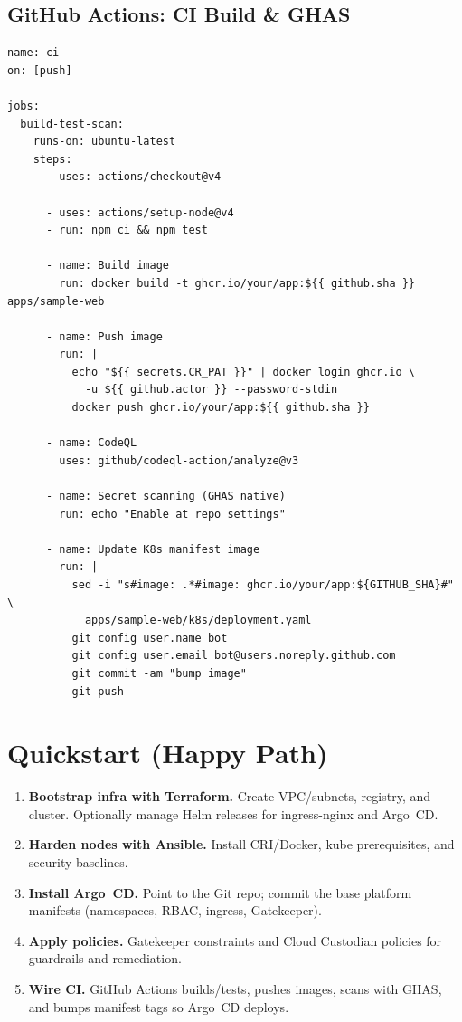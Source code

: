 \documentclass[11pt]{article}
\begin{document}
\subsection{GitHub Actions: CI Build \& GHAS}
\par
\begin{verbatim}
name: ci
on: [push]

jobs:
  build-test-scan:
    runs-on: ubuntu-latest
    steps:
      - uses: actions/checkout@v4

      - uses: actions/setup-node@v4
      - run: npm ci && npm test

      - name: Build image
        run: docker build -t ghcr.io/your/app:${{ github.sha }} apps/sample-web

      - name: Push image
        run: |
          echo "${{ secrets.CR_PAT }}" | docker login ghcr.io \
            -u ${{ github.actor }} --password-stdin
          docker push ghcr.io/your/app:${{ github.sha }}

      - name: CodeQL
        uses: github/codeql-action/analyze@v3

      - name: Secret scanning (GHAS native)
        run: echo "Enable at repo settings"

      - name: Update K8s manifest image
        run: |
          sed -i "s#image: .*#image: ghcr.io/your/app:${GITHUB_SHA}#" \
            apps/sample-web/k8s/deployment.yaml
          git config user.name bot
          git config user.email bot@users.noreply.github.com
          git commit -am "bump image"
          git push
\end{verbatim}

\section{Quickstart (Happy Path)}
\begin{enumerate}[leftmargin=2em,label=\textbf{Q\arabic*.}]
  \item \textbf{Bootstrap infra with Terraform.} Create VPC/subnets, registry, and cluster. Optionally manage Helm releases for ingress-nginx and Argo~CD.
  \item \textbf{Harden nodes with Ansible.} Install CRI/Docker, kube prerequisites, and security baselines.
  \item \textbf{Install Argo~CD.} Point to the Git repo; commit the base platform manifests (namespaces, RBAC, ingress, Gatekeeper).
  \item \textbf{Apply policies.} Gatekeeper constraints and Cloud Custodian policies for guardrails and remediation.
  \item \textbf{Wire CI.} GitHub Actions builds/tests, pushes images, scans with GHAS, and bumps manifest tags so Argo~CD deploys.
\end{enumerate}
\end{document}
